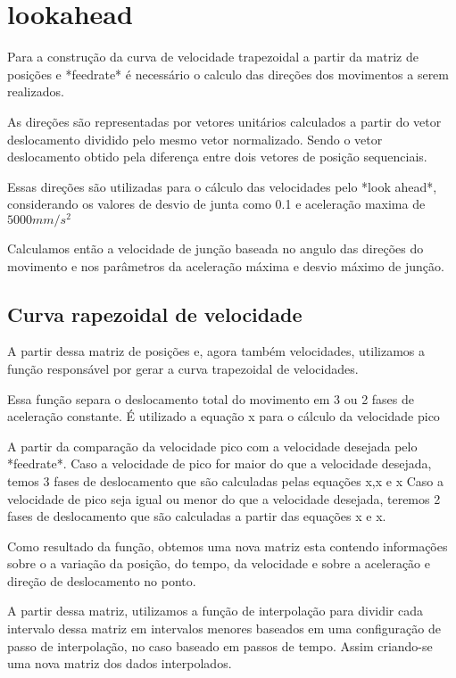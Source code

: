 \section{lookahead}

Para a construção da curva de velocidade trapezoidal a partir da matriz de posições
e *feedrate* é necessário o calculo das direções dos movimentos a serem realizados.

As direções são representadas por vetores unitários calculados a partir
do vetor deslocamento dividido pelo mesmo vetor normalizado. Sendo o vetor deslocamento
obtido pela diferença entre dois vetores de posição sequenciais.

Essas direções são utilizadas para o cálculo das velocidades pelo *look ahead*,
considerando os valores de desvio de junta como  0.1 e aceleração maxima de $5000 mm/s^2$

Calculamos então a velocidade de junção baseada no angulo das direções do movimento e
nos parâmetros da aceleração máxima e desvio máximo de junção.

\subsection{Curva rapezoidal de velocidade}
A partir dessa matriz de posições e, agora também velocidades,
utilizamos a função responsável por gerar a curva trapezoidal de velocidades.

Essa função separa o deslocamento total do movimento em 3 ou 2 fases de aceleração constante.
É utilizado a equação x para o cálculo da velocidade pico

A partir da comparação da velocidade pico com a velocidade desejada pelo *feedrate*.
Caso a velocidade de pico for maior do que a velocidade desejada, temos 3 fases de deslocamento
que são calculadas pelas equações x,x e x
Caso a velocidade de pico seja igual ou menor do que a velocidade desejada, teremos 2 fases de deslocamento
que são calculadas a partir das equações x e x.

Como resultado da função, obtemos uma nova matriz esta contendo informações
sobre o a variação da posição, do tempo, da velocidade e sobre a aceleração e direção de deslocamento no ponto.

A partir dessa matriz, utilizamos a função de interpolação para dividir cada intervalo dessa matriz em intervalos menores
baseados em uma configuração de passo de interpolação, no caso baseado em passos de tempo.
Assim criando-se uma nova matriz dos dados interpolados.

